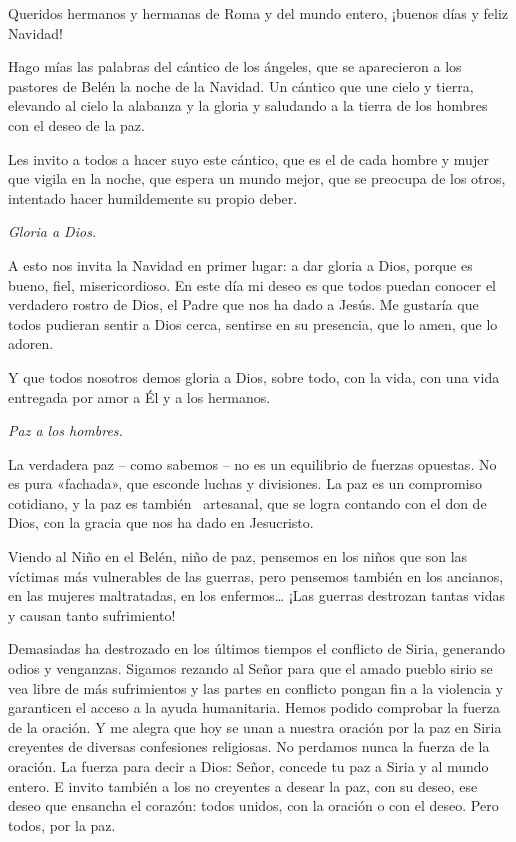 Queridos hermanos y hermanas de Roma y del mundo entero, ¡buenos días y
feliz Navidad!

Hago mías las palabras del cántico de los ángeles, que se aparecieron a
los pastores de Belén la noche de la Navidad. Un cántico que une cielo y
tierra, elevando al cielo la alabanza y la gloria y saludando a la
tierra de los hombres con el deseo de la paz.

Les invito a todos a hacer suyo este cántico, que es el de cada hombre y
mujer que vigila en la noche, que espera un mundo mejor, que se preocupa
de los otros, intentado hacer humildemente su propio deber.

\emph{Gloria a Dios.}

A esto nos invita la Navidad en primer lugar: a dar gloria a Dios,
porque es bueno, fiel, misericordioso. En este día mi deseo es que todos
puedan conocer el verdadero rostro de Dios, el Padre que nos ha dado a
Jesús. Me gustaría que todos pudieran sentir a Dios cerca, sentirse en
su presencia, que lo amen, que lo adoren.

Y que todos nosotros demos gloria a Dios, sobre todo, con la vida, con
una vida entregada por amor a Él y a los hermanos.

\emph{Paz a los hombres.}

La verdadera paz -- como sabemos -- no es un equilibrio de fuerzas
opuestas. No es pura «fachada», que esconde luchas y divisiones. La paz
es un compromiso cotidiano, y la paz es también~ artesanal, que se logra
contando con el don de Dios, con la gracia que nos ha dado en
Jesucristo.

Viendo al Niño en el Belén, niño de paz, pensemos en los niños que son
las víctimas más vulnerables de las guerras, pero pensemos también en
los ancianos, en las mujeres maltratadas, en los enfermos\ldots{} ¡Las
guerras destrozan tantas vidas y causan tanto sufrimiento!

Demasiadas ha destrozado en los últimos tiempos el conflicto de Siria,
generando odios y venganzas. Sigamos rezando al Señor para que el amado
pueblo sirio se vea libre de más sufrimientos y las partes en conflicto
pongan fin a la violencia y garanticen el acceso a la ayuda humanitaria.
Hemos podido comprobar la fuerza de la oración. Y me alegra que hoy se
unan a nuestra oración por la paz en Siria creyentes de diversas
confesiones religiosas. No perdamos nunca la fuerza de la oración. La
fuerza para decir a Dios: Señor, concede tu paz a Siria y al mundo
entero. E invito también a los no creyentes a desear la paz, con su
deseo, ese deseo que ensancha el corazón: todos unidos, con la oración o
con el deseo. Pero todos, por la paz.

